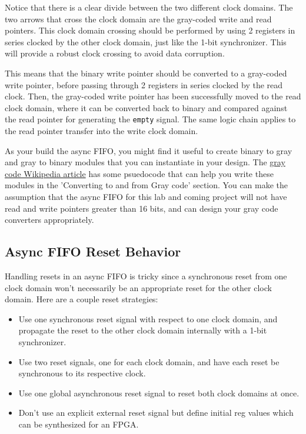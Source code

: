 \documentclass[11pt]{article}
\begin{document}
Notice that there is a clear divide between the two different clock domains. The two arrows that cross the clock domain are the gray-coded write and read pointers. This clock domain crossing should be performed by using 2 registers in series clocked by the other clock domain, just like the 1-bit synchronizer. This will provide a robust clock crossing to avoid data corruption.

This means that the binary write pointer should be converted to a gray-coded write pointer, before passing through 2 registers in series clocked by the read clock. Then, the gray-coded write pointer has been successfully moved to the read clock domain, where it can be converted back to binary and compared against the read pointer for generating the \verb|empty| signal. The same logic chain applies to the read pointer transfer into the write clock domain.

As your build the async FIFO, you might find it useful to create binary to gray and gray to binary modules that you can instantiate in your design. The \href{https://en.wikipedia.org/wiki/Gray_code}{gray code Wikipedia article} has some psuedocode that can help you write these modules in the 'Converting to and from Gray code' section. You can make the assumption that the async FIFO for this lab and coming project will not have read and write pointers greater than 16 bits, and can design your gray code converters appropriately.

\subsection{Async FIFO Reset Behavior}
Handling resets in an async FIFO is tricky since a synchronous reset from one clock domain won't necessarily be an appropriate reset for the other clock domain. Here are a couple reset strategies:

\begin{itemize}
	\item Use one synchronous reset signal with respect to one clock domain, and propagate the reset to the other clock domain internally with a 1-bit synchronizer.
	\item Use two reset signals, one for each clock domain, and have each reset be synchronous to its respective clock.
	\item Use one global asynchronous reset signal to reset both clock domains at once.
	\item Don't use an explicit external reset signal but define initial reg values which can be synthesized for an FPGA.
\end{itemize}
\end{document}

